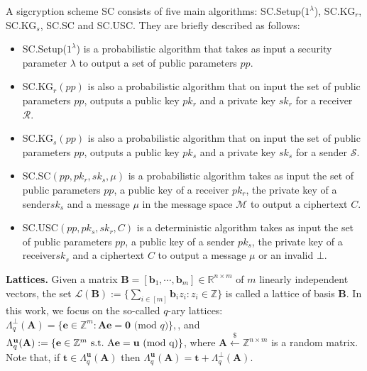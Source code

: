 \documentclass[a4paper,11pt,onecolumn]{elsarticle}
\def\ZZ{\mathbb{Z}}
\def\bf{\mathbf}
\def\e{\bf{e}}
\def\L{\Lambda}
\def\Lp{\Lambda^{\perp}}
\begin{document}
	A sigcryption scheme \textsf{SC} consists of five main algorithms: \textsf{SC.Setup($1^{\lambda}$)},  \textsf{SC.KG$_r$}, \textsf{SC.KG$_s$}, \textsf{SC.SC} and \textsf{SC.USC}. They are briefly described as follows:
	\begin{itemize}
		\item \textsf{SC.Setup($1^{\lambda}$)} is a probabilistic algorithm that takes as input a security parameter $\lambda$ to output a set of public parameters $pp$. 
		\item \textsf{SC.KG$_r (pp)$} is also a probabilistic algorithm that on input the set of public parameters $pp$, outputs a public key $pk_r$ and a private key $sk_r$ for a receiver $\mathcal{R}$. 
		\item \textsf{SC.KG$_s (pp)$} is also a probabilistic algorithm that on input the set of public parameters $pp$, outputs a public key $pk_s$ and a private key $sk_s$ for a sender $\mathcal{S}$. 
		\item  \textsf{SC.SC}$(pp,pk_r,sk_s,\mu)$ is a probabilistic algorithm takes as input the set of public parameters $pp$, a public key of a receiver $pk_r$, the private key of a sender$ sk_s$ and a message $\mu$ in the message space  $\mathcal{M}$  to output a  ciphertext $C$. 
		\item  \textsf{SC.USC$(pp,pk_s,sk_r,C)$} is a deterministic algorithm takes as input the set of public parameters $pp$, a public key of a sender $pk_s$, the private key of a receiver$ sk_s$ and a ciphertext $C$ to output a message $\mu$ or an invalid $\bot$. 
	\end{itemize}
	\fi
	
	
	
	
	



	\noindent \textbf{Lattices.} Given a matrix $\mathbf{B}=[\mathbf{b}_1, \cdots, \mathbf{b}_m]\in \mathbb{R}^{n \times m}$ of $m$ linearly independent vectors,  the set
	$\mathcal{L}(\mathbf{B}):=\{\sum_{i \in [m]}\mathbf{b}_iz_i: z_i\in \mathbb{Z}\}$ is called a lattice of basis $\mathbf{B}$. In this work, we focus on the so-called $q$-ary lattices:
	$ \Lambda_q^{\bot}(\mathbf{A})=\{\mathbf{e} \in \mathbb{Z}^m: \mathbf{A}\mathbf{e}=\mathbf{0} \text{ (mod } q) \},$, and $\L_q^{\bf{u}}(\textbf{A}) :=  \left\{ \e\in\ZZ^m~\rm{s.t.}~A\e=\mathbf{u} \text{ (mod } q) \right\}$, where  $\mathbf{A} \xleftarrow{\$} \mathbb{Z}^{n \times m}$ is a random matrix. Note that, if $\bf{t}\in\L_q^{\bf{u}}(\textbf{A})$ then $\L_q^{\bf{u}}(\textbf{A})=\bf{t}+\Lp_q(\textbf{A})$.
	
\end{document}
